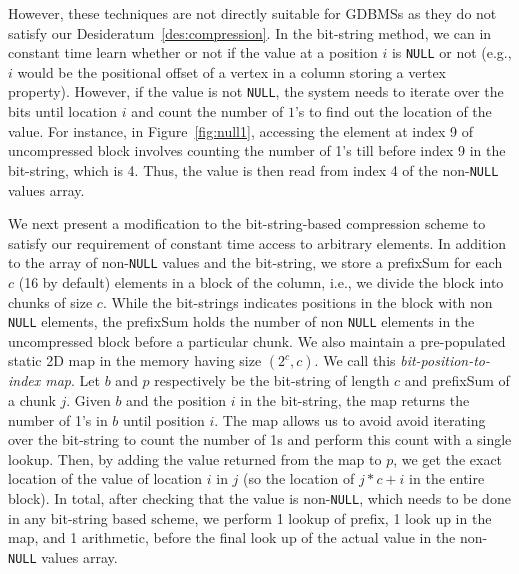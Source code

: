 However, these techniques are not directly suitable for GDBMSs as they do not satisfy our Desideratum~\ref{des:compression}. In the bit-string method, we can in constant time learn whether or not if the value at a position $i$ is \texttt{NULL} or not (e.g., $i$ would be the positional offset of a vertex in a column storing a vertex property). However, if the value is not \texttt{NULL}, the system needs to iterate over the bits until location $i$ and count the number of $1$'s to find out the location of the value. For instance, in Figure~\ref{fig:null1}, accessing the element at index 9 of uncompressed block involves counting the number of 1's till before index 9 in the bit-string, which is 4. Thus, the value is then read from index 4 of the non-\texttt{NULL} values array. 



We next present a modification to the bit-string-based compression scheme to satisfy our requirement of constant time access to arbitrary elements. In addition to the array of non-\texttt{NULL} values and the bit-string, we store a prefixSum for each $c$ (16 by default) elements in a block of the column, i.e., we divide the block into chunks of size $c$. While the bit-strings indicates positions in the block with non \texttt{NULL} elements, the prefixSum holds the number of non \texttt{NULL} elements in the uncompressed block before a particular chunk. We also maintain a pre-populated static 2D map in the memory having size $(2^c, c)$. We call this \emph{bit-position-to-index map}. Let $b$ and $p$ respectively be the bit-string of length $c$ and prefixSum of a chunk $j$. Given $b$ and the position $i$ in the bit-string, the map returns the number of 1's in $b$ until position $i$. The map  allows us to avoid avoid iterating over the bit-string to count the number of 1s and perform this count with a single lookup. Then, by adding the value returned from the map to $p$, we get the exact location of the value of location $i$ in $j$ (so the location of $j*c + i$ in the entire block). In total, after checking that the value is non-\texttt{NULL}, which needs to be done in any bit-string based scheme, we perform 1 lookup of prefix, 1 look up in the map, and 1 arithmetic, before the final look up of the actual value in the non-\texttt{NULL} values array.

